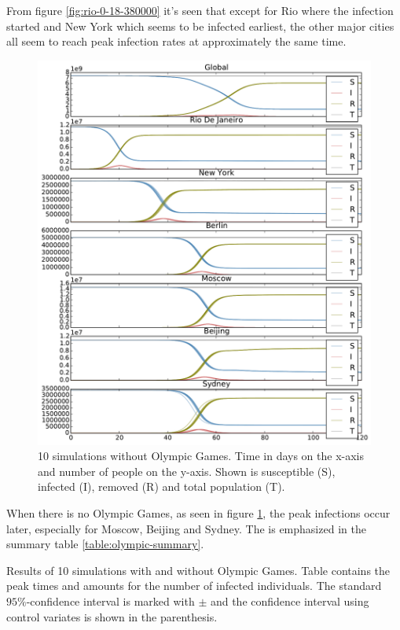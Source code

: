 From figure \ref{fig:rio-0-18-380000} it's seen that except for Rio where the infection started and New York which seems to be infected earliest, the other major cities all seem to reach peak infection rates at approximately the same time. 

\begin{figure}[H]
	\centering
	\includegraphics[width=1.0 \linewidth]{plots/no_rio.pdf}
	\caption{10 simulations without Olympic Games. Time in days on the x-axis and number of people on the y-axis. Shown is susceptible (S), infected (I), removed (R) and total population (T).}
	\label{fig:no_rio}
\end{figure}

When there is no Olympic Games, as seen in figure \ref{fig:no_rio}, the peak infections occur later, especially for Moscow, Beijing and Sydney. The is emphasized in the summary table \ref{table:olympic-summary}.

\begin{table}[H]
	\centering
	
	\caption{Results of 10 simulations with and without Olympic Games. Table contains the peak times and amounts for the number of infected individuals. The standard $95\%$-confidence interval is marked with $\pm$ and the confidence interval using control variates is shown in the parenthesis.}
	\label{table:olympic-summary}
\end{table}

